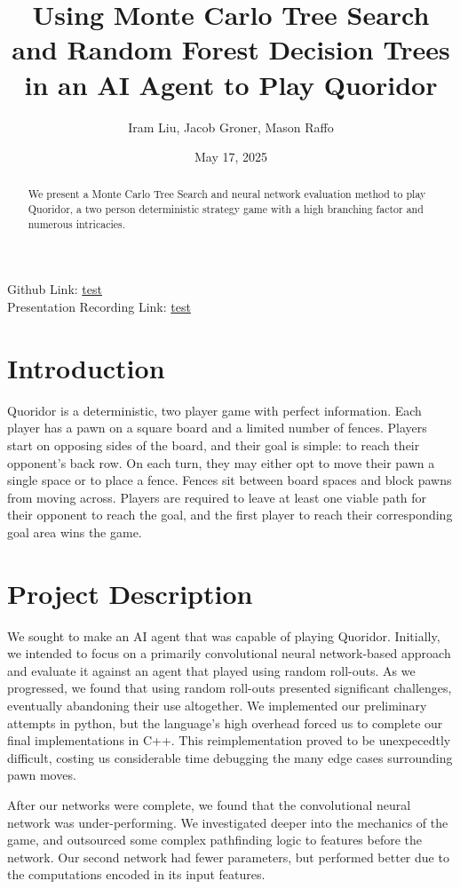\documentclass[10pt]{article}
\title{\bfseries Using Monte Carlo Tree Search and Random Forest Decision Trees in an AI Agent to Play Quoridor}
\author{
    Iram Liu, Jacob Groner, Mason Raffo
}
\date{May 17, 2025}
\newcommand{\githubLink}{\url{test}}
\newcommand{\presentationLink}{\url{test}}
\begin{document}
\maketitle

\begin{abstract}
We present a Monte Carlo Tree Search and neural network evaluation method to play Quoridor, a two person deterministic strategy game with a high branching factor and numerous intricacies.
\end{abstract}
Github Link: \githubLink \\
Presentation Recording Link: \presentationLink
\section{Introduction}
Quoridor is a deterministic, two player game with perfect information. Each player has a pawn on a square board and a limited number of fences. Players start on opposing sides of the board, and their goal is simple: to reach their opponent's back row. On each turn, they may either opt to move their pawn a single space or to place a fence. Fences sit between board spaces and block pawns from moving across. Players are required to leave at least one viable path for their opponent to reach the goal, and the first player to reach their corresponding goal area wins the game.

\section{Project Description}

We sought to make an AI agent that was capable of playing Quoridor. Initially, we intended to focus on a primarily convolutional neural network-based approach and evaluate it against an agent that played using random roll-outs. As we progressed, we found that using random roll-outs presented significant challenges, eventually abandoning their use altogether. We implemented our preliminary attempts in python, but the language's high overhead forced us to complete our final implementations in C++. This reimplementation proved to be unexpecedtly difficult, costing us considerable time debugging the many edge cases surrounding pawn moves.

After our networks were complete, we found that the convolutional neural network was under-performing. We investigated deeper into the mechanics of the game, and outsourced some complex pathfinding logic to features before the network. Our second network had fewer parameters, but performed better due to the computations encoded in its input features.
\end{document}
